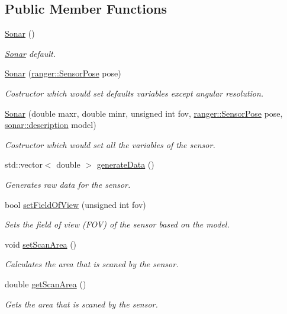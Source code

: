 \subsection*{Public Member Functions}
\begin{DoxyCompactItemize}
\item 
\hyperlink{classSonar_a71ef009d138f1e372fc35ca0cb6e85e2}{Sonar} ()
\begin{DoxyCompactList}\small\item\em \hyperlink{classSonar}{Sonar} default. \end{DoxyCompactList}\item 
\hyperlink{classSonar_a810fa5faf9ddee8ffd09c77556efda0c}{Sonar} (\hyperlink{structranger_1_1SensorPose}{ranger\+::\+Sensor\+Pose} pose)
\begin{DoxyCompactList}\small\item\em Costructor which would set defaults variables except angular resolution. \end{DoxyCompactList}\item 
\hyperlink{classSonar_ac29c8ae54d18c0ab4effbaa6fc389df4}{Sonar} (double maxr, double minr, unsigned int fov, \hyperlink{structranger_1_1SensorPose}{ranger\+::\+Sensor\+Pose} pose, \hyperlink{namespacesonar_a3fd8bcda99ebc0ba5ba1f926196fdf6b}{sonar\+::description} model)
\begin{DoxyCompactList}\small\item\em Costructor which would set all the variables of the sensor. \end{DoxyCompactList}\item 
std\+::vector$<$ double $>$ \hyperlink{classSonar_a33cc5f2df6cc1d96a59067be67eab781}{generate\+Data} ()
\begin{DoxyCompactList}\small\item\em Generates raw data for the sensor. \end{DoxyCompactList}\item 
bool \hyperlink{classSonar_a74d551d0ad61861ccf903f2535d799f0}{set\+Field\+Of\+View} (unsigned int fov)
\begin{DoxyCompactList}\small\item\em Sets the field of view (F\+OV) of the sensor based on the model. \end{DoxyCompactList}\item 
\mbox{\label{classSonar_a8234f001a2348746880010b742ccecd2}} 
void \hyperlink{classSonar_a8234f001a2348746880010b742ccecd2}{set\+Scan\+Area} ()
\begin{DoxyCompactList}\small\item\em Calculates the area that is scaned by the sensor. \end{DoxyCompactList}\item 
double \hyperlink{classSonar_ac47b8e7936dfd5c3bde262baf301d46d}{get\+Scan\+Area} ()
\begin{DoxyCompactList}\small\item\em Gets the area that is scaned by the sensor. \end{DoxyCompactList}\end{DoxyCompactItemize}
